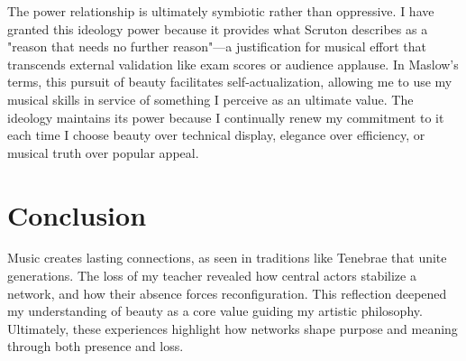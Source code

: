 \documentclass{article} %
\begin{document}
The power relationship is ultimately symbiotic rather than oppressive. I have granted this ideology power because it provides what Scruton describes as a "reason that needs no further reason"—a justification for musical effort that transcends external validation like exam scores or audience applause. In Maslow's terms, this pursuit of beauty facilitates self-actualization, allowing me to use my musical skills in service of something I perceive as an ultimate value. The ideology maintains its power because I continually renew my commitment to it each time I choose beauty over technical display, elegance over efficiency, or musical truth over popular appeal.

\section{Conclusion}

Music creates lasting connections, as seen in traditions like Tenebrae that unite generations. 
The loss of my teacher revealed how central actors stabilize a network, and how their absence forces reconfiguration. 
This reflection deepened my understanding of beauty as a core value guiding my artistic philosophy. 
Ultimately, these experiences highlight how networks shape purpose and meaning through both presence and loss.


%
%


\label{last_page}
\end{document}
